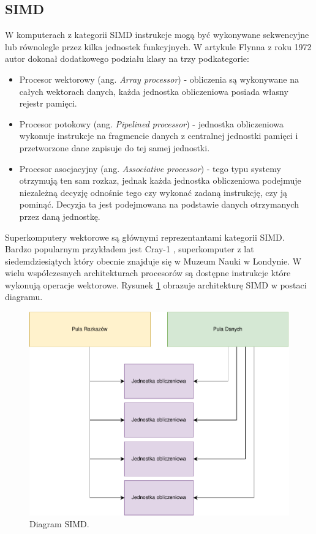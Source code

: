 \documentclass[a4paper,12pt]{book} %
\begin{document}
\subsection{SIMD}
W komputerach z kategorii SIMD instrukcje mogą być wykonywane sekwencyjne lub równolegle przez kilka jednostek funkcyjnych. W artykule Flynna z roku 1972 \cite{Flynn1972} autor dokonał dodatkowego podziału klasy na trzy podkategorie:
\begin{itemize}
	\item Procesor wektorowy (ang. \emph{Array processor}) - obliczenia są wykonywane na całych wektorach danych, każda jednostka obliczeniowa posiada własny rejestr pamięci.
	\item Procesor potokowy (ang. \emph{Pipelined processor}) - jednostka obliczeniowa wykonuje instrukcje na fragmencie danych z centralnej jednostki pamięci i przetworzone dane zapisuje do tej samej jednostki.
	\item Procesor asocjacyjny (ang. \emph{Associative processor}) - tego typu systemy otrzymują ten sam rozkaz, jednak każda jednostka obliczeniowa podejmuje niezależną decyzję odnośnie tego czy wykonać zadaną instrukcję, czy ją pominąć. Decyzja ta jest podejmowana na podstawie danych otrzymanych przez daną jednostkę.
\end{itemize}
Superkomputery wektorowe są głównymi reprezentantami kategorii SIMD. Bardzo popularnym przykładem jest Cray-1 \cite{Cray-1}, superkomputer z lat siedemdziesiątych który obecnie znajduje się w Muzeum Nauki w Londynie. W wielu współczesnych architekturach procesorów są dostępne instrukcje które wykonują operacje wektorowe. Rysunek \ref{fig:simd} obrazuje architekturę SIMD w postaci diagramu.
\begin{figure}
	\centering
	\includegraphics[scale=1]{assets/SIMD.pdf}
	\caption{Diagram SIMD.}
	\label{fig:simd}
\end{figure}
\end{document}
